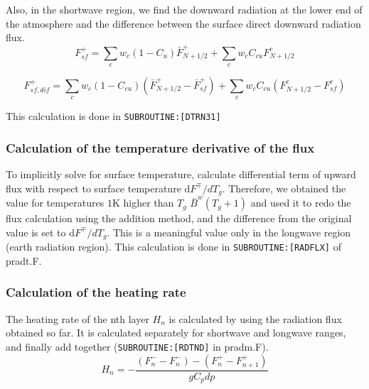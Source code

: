 Also, in the shortwave region, we find the downward radiation at the
lower end of the atmosphere and the difference between the surface
direct downward radiation flux. \begin{equation}
F_{s f}^{+}=\sum_{c} w_{c}\left(1-C_{u}\right) \bar{F}_{N+1 / 2}^{+}+\sum_{c} w_{c} C_{c u} F_{N+1 / 2}^{c}
\end{equation}

\begin{equation}
F_{s f, d i f}^{+}=\sum_{c} w_{c}\left(1-C_{c u}\right)\left(\bar{F}_{N+1 / 2}^{+}-\bar{F}_{s f}^{+}\right)+\sum_{c} w_{c} C_{c u}\left(F_{N+1 / 2}^{c}-F_{s f}^{c}\right)
\end{equation}

This calculation is done in \texttt{SUBROUTINE:{[}DTRN31{]}}

\hypertarget{calculation-of-the-temperature-derivative-of-the-flux}{%
\subsubsection{Calculation of the temperature derivative of the
flux}\label{calculation-of-the-temperature-derivative-of-the-flux}}

To implicitly solve for surface temperature, calculate differential term
of upward flux with respect to surface temperature
\(\mathrm{d}F^{\mp}/dT_{g}\). Therefore, we obtained the value for
temperatures \(1\text{K}\) higher than \(T_g\)
\(\bar{B}^{w}\left(T_{g}+1\right)\) and used it to redo the flux
calculation using the addition method, and the difference from the
original value is set to \(\mathrm{d}F^{\mp}/dT_{g}\). This is a
meaningful value only in the longwave region (earth radiation region).
This calculation is done in \texttt{SUBROUTINE:{[}RADFLX{]}} of pradt.F.

\hypertarget{calculation-of-the-heating-rate}{%
\subsubsection{Calculation of the heating
rate}\label{calculation-of-the-heating-rate}}

The heating rate of the nth layer \(H_n\) is calculated by using the
radiation flux obtained so far. It is calculated separately for
shortwave and longwave ranges, and finally add together
(\texttt{SUBROUTINE:{[}RDTND{]}} in pradm.F). \begin{equation}
H_{n}=-\frac{\left(F_{n}^{-}-F_{n}^{-}\right)-\left(F_{n}^{+}-F_{n+1}^{+}\right)}{g C_{p} d p}
\end{equation}

